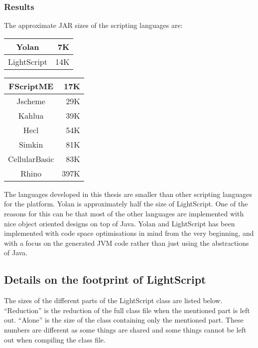 \documentclass[11pt]{report}
\begin{document}
\subsubsection{Results}
The approximate JAR sizes of the scripting languages are:
\begin{center}
\begin{tabular}{|c|r|} \hline 
Yolan & 7K \\ \hline 
LightScript & 14K \\ \hline 
\end{tabular}
\begin{tabular}{|c|r|} \hline 
FScriptME & 17K \\ \hline 
Jscheme & 29K \\ \hline 
Kahlua & 39K \\ \hline 
Hecl & 54K \\ \hline 
Simkin & 81K \\ \hline 
CellularBasic & 83K \\ \hline 
Rhino & 397K \\ \hline 
\end{tabular}
\end{center}

The languages developed in this thesis are smaller than other scripting languages for the platform. 
Yolan is approximately half the size of LightScript. 
One of the reasons for this can be that most of the other languages are implemented with nice object oriented designs on top of Java. Yolan and LightScript has been implemented with code space optimisations in mind from the very beginning, and with a focus on the generated JVM code rather than just using the abstractions of Java.


\subsection{Details on the footprint of LightScript}
The sizes of the different parts of the LightScript class are listed below.
``Reduction'' is the reduction of the full class file when the mentioned part is left out. ``Alone'' is the size of the class containing only the mentioned part. These numbers are different as some things are shared and some things cannot be left out when compiling the class file.
\end{document}
